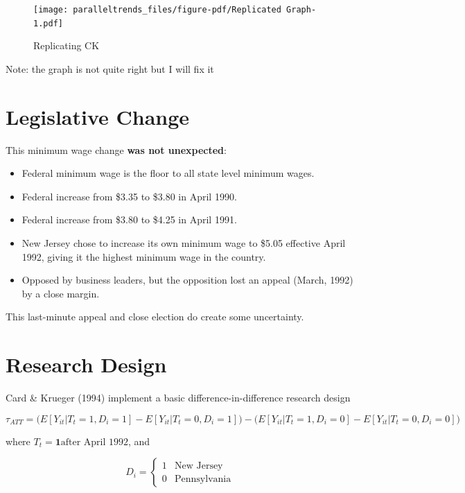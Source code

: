\documentclass[
  letterpaper,
  DIV=11,
  numbers=noendperiod]{scrreprt}
\providecommand{\tightlist}{%
  \setlength{\itemsep}{0pt}\setlength{\parskip}{0pt}}\usepackage{longtable,booktabs,array}
\theoremstyle{definition}
\theoremstyle{remark}
\begin{document}
\begin{figure}

{\centering \texttt{[image: paralleltrends\_files/figure-pdf/Replicated Graph-1.pdf]}

}

\caption{Replicating CK}

\end{figure}

Note: the graph is not quite right but I will fix it\\

\hypertarget{legislative-change}{%
\section{Legislative Change}\label{legislative-change}}

This minimum wage change \textbf{was not unexpected}:

\begin{itemize}
\tightlist
\item
  Federal minimum wage is the floor to all state level minimum wages.
\item
  Federal increase from \$3.35 to \$3.80 in April 1990.
\item
  Federal increase from \$3.80 to \$4.25 in April 1991.
\item
  New Jersey chose to increase its own minimum wage to \$5.05 effective
  April 1992, giving it the highest minimum wage in the country.
\item
  Opposed by business leaders, but the opposition lost an appeal (March,
  1992) by a close margin.
\end{itemize}

This last-minute appeal and close election do create some uncertainty.

\hypertarget{research-design}{%
\section{Research Design}\label{research-design}}

Card \& Krueger (1994) implement a basic difference-in-difference
research design

\[
\tau_{ATT} = \big(E[Y_{it}|T_t=1,D_i=1] - E[Y_{it}|T_t=0,D_i=1]\big) - \big(E[Y_{it}|T_t=1,D_i=0] - E[Y_{it}|T_t=0,D_i=0]\big)
\]

where \(T_t = \mathbf{1}{\text{after April 1992}}\), and

\[
D_i = 
\begin{cases}
1 & \text{New Jersey} \\
0 & \text{Pennsylvania}
\end{cases}
\]
\end{document}

